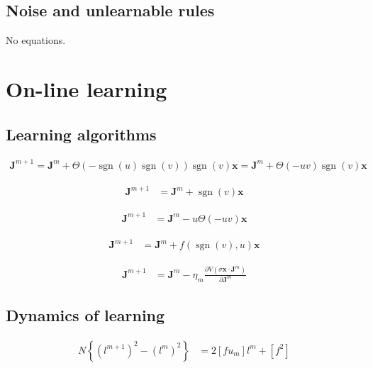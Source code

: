 \documentclass{article}
\begin{document}
\subsection{Noise and unlearnable rules}

No equations.

\clearpage

\section{On-line learning}

\subsection{Learning algorithms}

\begin{align*}
\boldsymbol{J}^{m+1}=\boldsymbol{J}^{m}+\Theta(-\operatorname{sgn}(u) \operatorname{sgn}(v)) \operatorname{sgn}(v) \boldsymbol{x}=\boldsymbol{J}^{m}+\Theta(-u v) \operatorname{sgn}(v) \boldsymbol{x} \tag{8.49}
\end{align*}

\begin{align*}
\boldsymbol{J}^{m+1} &= \boldsymbol{J}^{m} + \operatorname{sgn}(v) \boldsymbol{x} \tag{8.50}
\end{align*}

\begin{align*}
\boldsymbol{J}^{m+1} &= \boldsymbol{J}^{m} - u \Theta(-u v) \boldsymbol{x} \tag{8.51}
\end{align*}

\begin{align*}
\boldsymbol{J}^{m+1} &= \boldsymbol{J}^{m} + f(\operatorname{sgn}(v), u) \boldsymbol{x} \tag{8.52}
\end{align*}

\begin{align*}
\boldsymbol{J}^{m+1} &= \boldsymbol{J}^{m} - \eta_{m} \frac{\partial V\left(\sigma \boldsymbol{x} \cdot \boldsymbol{J}^{m}\right)}{\partial \boldsymbol{J}^{m}} \tag{8.53}
\end{align*}

\subsection{Dynamics of learning}

\begin{align*}
N\left\{\left(l^{m+1}\right)^{2} - \left(l^{m}\right)^{2}\right\} &= 2 \left[f u_{m}\right] l^{m} + \left[f^{2}\right] \tag{8.54}
\end{align*}
\end{document}
